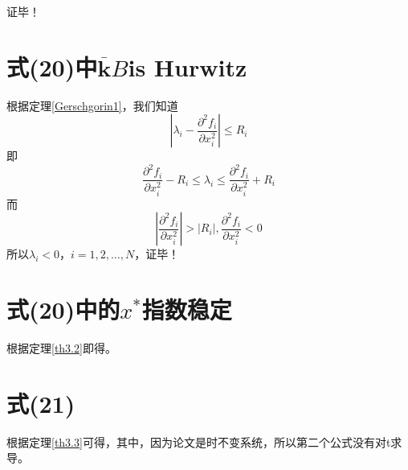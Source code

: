 \documentclass[lang=cn,10pt]{elegantbook}
\newcommand\bv[1]{\boldsymbol{#1}}
\begin{document}
证毕！


\section{式(20)中\texorpdfstring{$\overline{\bv{k}} B$}{防缺字}is Hurwitz}
根据定理\ref{Gerschgorin1}，我们知道
\begin{equation*}
	|\lambda_i - \frac{\partial^2f_i}{\partial x_i^2}| \leq R_i
\end{equation*}
即
\begin{equation*}
	\frac{\partial^2f_i}{\partial x_i^2} - R_i \leq \lambda_i \leq \frac{\partial^2f_i}{\partial x_i^2} + R_i
\end{equation*}
而
\begin{equation*}
	|\frac{\partial^2f_i}{\partial x_i^2}| > |R_i|,\frac{\partial^2f_i}{\partial x_i^2} < 0
\end{equation*}
所以$\lambda_i < 0$，$i = 1, 2,\ldots,N$，证毕！

\section{式(20)中的$x^*$指数稳定}
根据定理\ref{th3.2}即得。

\section{式(21)}
根据定理\ref{th3.3}可得，其中，因为论文是时不变系统，所以第二个公式没有对t求导。
\end{document}
